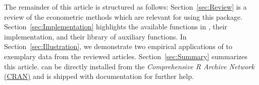The remainder of this article is structured as follows: Section~\ref{sec:Review} is a review of the econometric methods which are relevant for using this  package. Section~\ref{sec:Implementation} highlights the available functions in , their implementation, and their library of auxiliary functions. In Section~\ref{sec:Illustration}, we demonstrate two empirical applications of  to exemplary data from the reviewed articles. Section~\ref{sec:Summary} summarizes this article.  can be directly installed from the \textit{Comprehensive R Archive Network} \href{https://CRAN.R-project.org/package=pvars}{(CRAN)} and is shipped with documentation for further help.


